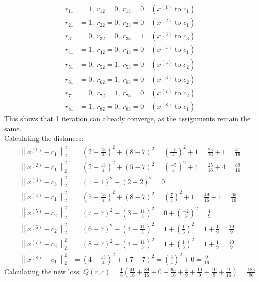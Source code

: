 \begin{align*}
r_{11} &= 1, \ r_{12} = 0, \ r_{13} = 0 \quad (x^{(1)} \text{ to } c_1)\\
r_{21} &= 1, \ r_{22} = 0, \ r_{23} = 0 \quad (x^{(2)} \text{ to } c_1)\\
r_{31} &= 0, \ r_{32} = 0, \ r_{33} = 1 \quad (x^{(3)} \text{ to } c_3)\\
r_{41} &= 1, \ r_{42} = 0, \ r_{43} = 0 \quad (x^{(4)} \text{ to } c_1)\\
r_{51} &= 0, \ r_{52} = 1, \ r_{53} = 0 \quad (x^{(5)} \text{ to } c_2)\\
r_{61} &= 0, \ r_{62} = 1, \ r_{63} = 0 \quad (x^{(6)} \text{ to } c_2)\\
r_{71} &= 0, \ r_{72} = 1, \ r_{73} = 0 \quad (x^{(7)} \text{ to } c_2)\\
r_{81} &= 1, \ r_{82} = 0, \ r_{83} = 0 \quad (x^{(8)} \text{ to } c_1)
\end{align*}
This shows that 1 iteration can already converge, as the assignments remain the same.\\
Calculating the distances:
\begin{align*}
\left\|x^{(1)} - c_1\right\|_2^2 &= \left(2 - \frac{13}{4}\right)^2 + (8 - 7)^2 = \left(\frac{-5}{4}\right)^2 + 1 = \frac{25}{16} + 1 = \frac{41}{16} \\
\left\|x^{(2)} - c_1\right\|_2^2 &= \left(2 - \frac{13}{4}\right)^2 + (5 - 7)^2 = \left(\frac{-5}{4}\right)^2 + 4 = \frac{25}{16} + 4 = \frac{89}{16} \\
\left\|x^{(3)} - c_3\right\|_2^2 &= (1 - 1)^2 + (2 - 2)^2 = 0 \\
\left\|x^{(4)} - c_1\right\|_2^2 &= \left(5 - \frac{13}{4}\right)^2 + (8 - 7)^2 = \left(\frac{7}{4}\right)^2 + 1 = \frac{49}{16} + 1 = \frac{65}{16} \\
\left\|x^{(5)} - c_2\right\|_2^2 &= (7 - 7)^2 + \left(3 - \frac{11}{3}\right)^2 = 0 + \left(\frac{-2}{3}\right)^2 = \frac{4}{9} \\
\left\|x^{(6)} - c_2\right\|_2^2 &= (6 - 7)^2 + \left(4 - \frac{11}{3}\right)^2 = 1 + \left(\frac{1}{3}\right)^2 = 1 + \frac{1}{9} = \frac{10}{9} \\
\left\|x^{(7)} - c_2\right\|_2^2 &= (8 - 7)^2 + \left(4 - \frac{11}{3}\right)^2 = 1 + \left(\frac{1}{3}\right)^2 = 1 + \frac{1}{9} = \frac{10}{9} \\
\left\|x^{(8)} - c_1\right\|_2^2 &= \left(4 - \frac{13}{4}\right)^2 + (7 - 7)^2 = \left(\frac{3}{4}\right)^2 + 0 = \frac{9}{16}
\end{align*}
Calculating the new loss:
$Q(r,c) = \frac{1}{8} \left( \frac{41}{16} + \frac{89}{16} + 0 + \frac{65}{16} + \frac{4}{9} + \frac{10}{9} + \frac{10}{9} + \frac{9}{16} \right) = \frac{185}{96}$






\newpage